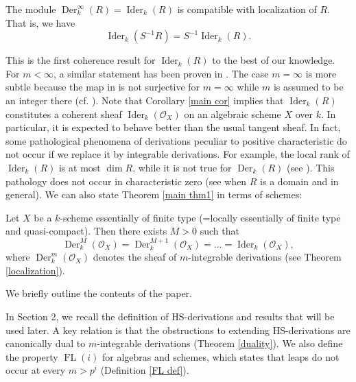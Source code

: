 \documentclass{amsart}
\newcommand{\FL}[1]{\operatorname{FL}(#1)}
\begin{document}
\begin{corollary}[{=Corollary \ref{localization ider cor}}]\label{main cor}
The module $\operatorname{Der}_k^\infty(R)=\operatorname{Ider}_k(R)$ is compatible with localization of $R$. That is, we have $$\operatorname{Ider}_k(S^{-1}R)=S^{-1}\operatorname{Ider}_k(R).$$
\end{corollary}
This is the first coherence result for $\operatorname{Ider}_k(R)$ to the best of our knowledge. For $m<\infty$, a similar statement has been proven in \cite[Corollary 2.3.5]{NARVAEZMACARRO20122712}. The case $m=\infty$ is more subtle because the map in \cite[Corollary 1.3.6]{NARVAEZMACARRO20122712} is not surjective for $m=\infty$ while $m$ is assumed to be an integer there (cf. \cite[Example 1.4]{MR1764573}). Note that Corollary \ref{main cor} implies that $\operatorname{Ider}_k(R)$ constitutes a coherent sheaf $\operatorname{Ider}_k(\mathcal{O}_X)$ on an algebraic scheme $X$ over $k$. In particular, it is expected to behave better than the usual tangent sheaf. In fact, some pathological phenomena of derivations peculiar to positive characteristic do not occur if we replace it by integrable derivations. For example, the local rank of $\operatorname{Ider}_k(R)$ is at most $\operatorname{dim}R$, while it is not true for $\operatorname{Der}_k(R)$ (see \cite{MR554764}). This pathology does not occur in characteristic zero (see \cite{MR366909} when $R$ is a domain and \cite{MR498523} in general). We can also state Theorem \ref{main thm1} in terms of schemes:
\begin{theorem}[{= Theorem \ref{infty integrable thm schemes}}]\label{main thm3}
    Let $X$ be a $k$-scheme essentially of finite type (=locally essentially of finite type and quasi-compact). Then there exists $M>0$ such that
$$ \operatorname{Der}_k^M(\mathcal{O}_X)= \operatorname{Der}_k^{M+1}(\mathcal{O}_X)=\dots=\operatorname{Ider}_k(\mathcal{O}_X),$$
where $\operatorname{Der}_k^m(\mathcal{O}_X)$ denotes the sheaf of $m$-integrable derivations (see Theorem \ref{localization}).
\end{theorem}

We briefly outline the contents of the paper.

In Section 2, we recall the definition of HS-derivations and results that will  be used later. A key relation is that the obstructions to extending HS-derivations are canonically dual to $m$-integrable derivations (Theorem \ref{duality}). We also define the property $\FL{i}$ for algebras and schemes, which states that leaps do not occur at every $m> p^i$ (Definition \ref{FL def}).
\end{document}
